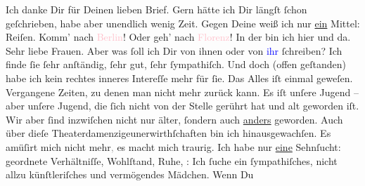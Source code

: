            Ich danke Dir für Deinen lieben Brief. Gern hätte ich Dir längſt ſchon geſchrieben,
               habe aber unendlich wenig Zeit.\pend
           \pstart
           Gegen Deine \label{K_L02903-1v}\label{K_L02903-1h} weiß ich nur \uline{ein} Mittel: Reiſen.
               Komm’ nach \textcolor{pink}{Berlin}{}\ledrightnote{\textcolor{pink}{Berlin}}! Oder geh’ nach \textcolor{pink}{Florenz}{}\ledrightnote{\textcolor{pink}{Florenz}}!\pend
           \pstart
           \strikeout{\textcolor{gray}{Bei}} In der \label{K_L02903-2v}\label{K_L02903-2h} bin ich hier und da. Sehr liebe Frauen. 
               Aber was ſoll ich Dir {\pb}von ihnen oder von \textcolor{blue}{ihr}{}\ledrightnote{{$\rightarrow$}\textcolor{blue}{Marie Glümer}} ſchreiben?
               Ich finde ſie ſehr anſtändig, ſehr gut, ſehr ſympathiſch. Und doch (offen geſtanden)
               habe ich kein rechtes inneres Intereſſe mehr für ſie. Das Alles iſt einmal geweſen.
               Vergangene Zeiten, zu denen man nicht mehr zurück kann. Es iſt unſere Jugend – aber
               unſere Jugend, die ſich nicht von der Stelle gerührt hat und alt geworden iſt. Wir
               aber ſind inzwiſchen nicht nur älter, ſondern auch \uline{anders} geworden.\pend
           \pstart
           Auch über dieſe Theaterdamenzigeunerwirthſchaften bin ich hinausgewachſen. Es amüſirt
               mich nicht mehr\textcolor{gray}{,} es macht mich \strikeout{\textcolor{gray}{trau}} traurig. {\pb}Ich habe nur \uline{eine} Sehnſucht: geordnete Verhältniſſe, Wohlſtand, Ruhe, \label{K_L02903-4v}\label{K_L02903-4h}: Ich
               ſuche ein ſympathiſches, nicht allzu künſtleriſches und vermögendes Mädchen. Wenn Du
